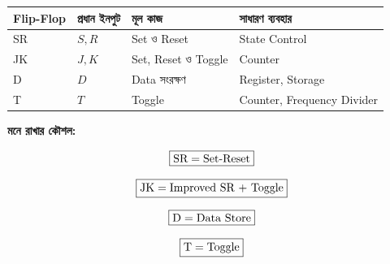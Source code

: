 \begin{center}

\renewcommand{\arraystretch}{1.25}

\begin{tabularx}
{\textwidth}
{|L{0.16\textwidth}|L{0.18\textwidth}|Y|Y|}

\hline


\textbf{\textenglish{Flip-Flop}}
&
\textbf{প্রধান ইনপুট}
&
\textbf{মূল কাজ}
&
\textbf{সাধারণ ব্যবহার}
\\
\hline

\textenglish{SR}
&
\(S,R\)
&
\textenglish{Set} ও \textenglish{Reset}
&
\textenglish{State Control}
\\
\hline

\textenglish{JK}
&
\(J,K\)
&
\textenglish{Set, Reset} ও \textenglish{Toggle}
&
\textenglish{Counter}
\\
\hline

\textenglish{D}
&
\(D\)
&
\textenglish{Data} সংরক্ষণ
&
\textenglish{Register, Storage}
\\
\hline

\textenglish{T}
&
\(T\)
&
\textenglish{Toggle}
&
\textenglish{Counter, Frequency Divider}
\\
\hline

\end{tabularx}

\end{center}



\par\begingroup


\textbf{মনে রাখার কৌশল:}

\[
\boxed{
\text{\textenglish{SR}}
=
\text{\textenglish{Set-Reset}}
}
\]

\[
\boxed{
\text{\textenglish{JK}}
=
\text{\textenglish{Improved SR + Toggle}}
}
\]

\[
\boxed{
\text{\textenglish{D}}
=
\text{\textenglish{Data Store}}
}
\]

\[
\boxed{
\text{\textenglish{T}}
=
\text{\textenglish{Toggle}}
}
\]

\par\endgroup


